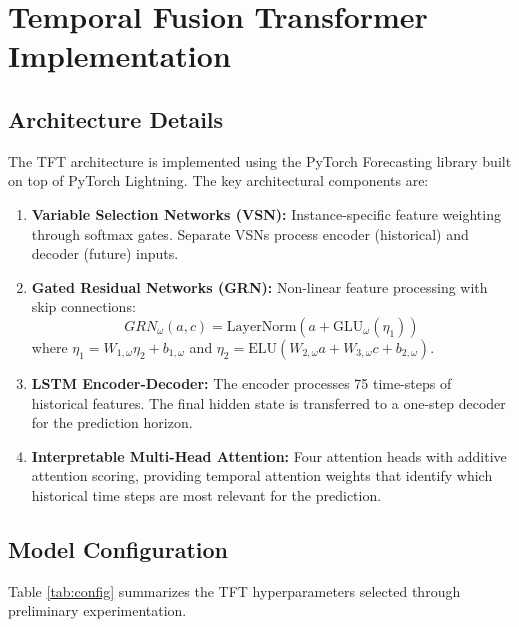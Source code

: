 \section{Temporal Fusion Transformer Implementation}

\subsection{Architecture Details}

The TFT architecture is implemented using the PyTorch Forecasting library built on top of PyTorch Lightning. The key architectural components are:

\begin{enumerate}
    \item \textbf{Variable Selection Networks (VSN):} Instance-specific feature weighting through softmax gates. Separate VSNs process encoder (historical) and decoder (future) inputs.

    \item \textbf{Gated Residual Networks (GRN):} Non-linear feature processing with skip connections:
    \begin{equation}
    GRN_\omega(a, c) = \text{LayerNorm}(a + \text{GLU}_\omega(\eta_1))
    \end{equation}
    where $\eta_1 = W_{1,\omega}\eta_2 + b_{1,\omega}$ and $\eta_2 = \text{ELU}(W_{2,\omega}a + W_{3,\omega}c + b_{2,\omega})$.

    \item \textbf{LSTM Encoder-Decoder:} The encoder processes 75 time-steps of historical features. The final hidden state is transferred to a one-step decoder for the prediction horizon.

    \item \textbf{Interpretable Multi-Head Attention:} Four attention heads with additive attention scoring, providing temporal attention weights that identify which historical time steps are most relevant for the prediction.
\end{enumerate}

\subsection{Model Configuration}

Table \ref{tab:config} summarizes the TFT hyperparameters selected through preliminary experimentation.

